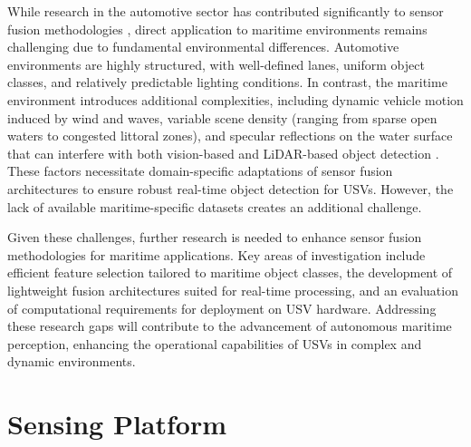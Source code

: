 \documentclass{erauthesis}
\begin{document}
While research in the automotive sector has contributed significantly to sensor fusion methodologies \cite{yeong2021,clunie2021,roriz2022,cui2022,das2022,liu2023a}, direct application to maritime environments remains challenging due to fundamental environmental differences. 
Automotive environments are highly structured, with well-defined lanes, uniform object classes, and relatively predictable lighting conditions. 
In contrast, the maritime environment introduces additional complexities, including dynamic vehicle motion induced by wind and waves, variable scene density (ranging from sparse open waters to congested littoral zones), and specular reflections on the water surface that can interfere with both vision-based \cite{liu2023a} and \ac{LiDAR}-based object detection \cite{ahmed2024}.%
These factors necessitate domain-specific adaptations of sensor fusion architectures to ensure robust real-time object detection for \acp{USV}. 
However, the lack of available maritime-specific datasets \cite{jun-hwa2022,su2023,thompson2023} creates an additional challenge.

Given these challenges, further research is needed to enhance sensor fusion methodologies for maritime applications. 
Key areas of investigation include efficient feature selection tailored to maritime object classes, the development of lightweight fusion architectures suited for real-time processing, and an evaluation of computational requirements for deployment on \ac{USV} hardware. 
Addressing these research gaps will contribute to the advancement of autonomous maritime perception, enhancing the operational capabilities of \acp{USV} in complex and dynamic environments.

\chapter{Sensing Platform} \label{sensing_platform}

\end{document}
